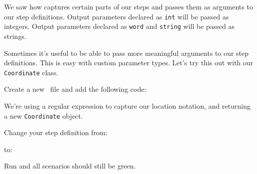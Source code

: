 We saw how \CUKE{} captures certain parts of our steps and passes them as arguments to our step definitions. Output parameters declared as \texttt{\LEFTCURLY{}int\RIGHTCURLY{}} will be passed as integers. Output parameters declared as \texttt{\LEFTCURLY{}word\RIGHTCURLY{}} and \texttt{\LEFTCURLY{}string\RIGHTCURLY{}} will be passed as strings.

Sometimes it's useful to be able to pass more meaningful arguments to our step definitions. This is easy with custom parameter types. Let's try this out with our \texttt{Coordinate} class.

Create a new \ file and add the following code:



We're using a regular expression to capture our location notation, and returning a new \texttt{Coordinate} object.

Change your step definition from:


to:


Run \CUKE{} and all scenarios should still be green.

